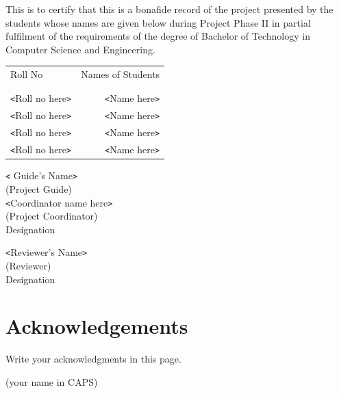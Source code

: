 \documentclass[a4paper, 12pt]{report}
\theoremstyle{definition}
\begin{document}
	\vspace*{.8cm}
	This is to certify that this is a bonafide record of the project presented by the students whose names are given below during Project Phase II in partial fulfilment of the requirements of the degree of Bachelor of Technology in Computer Science and Engineering.\\[1.0cm]

\begin{table}[h]
\centering
\begin{tabular}{lr}
Roll No & Names of Students \\ \\ \hline
\\
\texttt{<}Roll no here\texttt{>} & \texttt{<}Name here\texttt{>} \\ 
\texttt{<}Roll no here\texttt{>} & \texttt{<}Name here\texttt{>} \\
\texttt{<}Roll no here\texttt{>} & \texttt{<}Name here\texttt{>} \\
\texttt{<}Roll no here\texttt{>} & \texttt{<}Name here\texttt{>} \\
\end{tabular}
\end{table}



\begin{flushleft}
  \texttt{<} Guide's Name\texttt{>}\\
(Project Guide)\\  [1cm]

 \texttt{<}Coordinator name here\texttt{>}\\
(Project Coordinator)\\
Designation\\
\end{flushleft}
\begin{flushright}
\texttt{<}Reviewer's Name\texttt{>}\\
(Reviewer)\\
Designation
\end{flushright}




\newpage
	\clearpage
	\tableofcontents
	
	\chapter*{Acknowledgements}
	Write your acknowledgments in this page.\\
	\vspace{1cm}
	\begin{flushright}
		(your name in CAPS)
	\end{flushright}
	\listoffigures
	\listoftables
	\newpage
\end{document}
